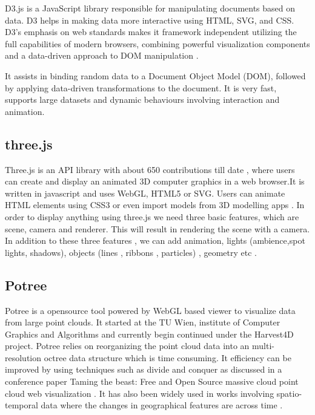     D3.js is a JavaScript library responsible for manipulating
    documents based on data. D3 helps in making data more interactive
    using HTML, SVG, and CSS. D3’s emphasis on web standards makes it
    framework independent utilizing the full capabilities of modern
    browsers, combining powerful visualization components and a
    data-driven approach to DOM manipulation \cite{www-d3}.

    It assists in binding random data to a Document Object Model
    (DOM), followed by applying data-driven transformations to the
    document. It is very fast, supports large datasets and dynamic
    behaviours involving interaction and animation.

    
\subsection{three.js}

    Three.js is an API library with about 650 contributions till date
    , where users can create and display an animated 3D computer
    graphics in a web browser.It is written in javascript and uses
    WebGL, HTML5 or SVG. Users can animate HTML elements using CSS3 or
    even import models from 3D modelling apps
    \cite{www-threejs-wiki}. In order to display anything using
    three.js we need three basic features, which are scene, camera and
    renderer. This will result in rendering the scene with a
    camera. In addition to these three features , we can add
    animation, lights (ambience,spot lights, shadows), objects (lines
    , ribbons , particles) , geometry etc \cite{www-threejs-webpage}.
    
\subsection{Potree}

    Potree \cite{www-potree} is a opensource tool powered by WebGL
    based viewer to visualize data from large point clouds. It started
    at the TU Wien, institute of Computer Graphics and Algorithms and
    currently begin continued under the Harvest4D project. Potree
    relies on reorganizing the point cloud data into an
    multi-resolution octree data structure which is time consuming. It
    efficiency can be improved by using techniques such as divide and
    conquer as discussed in a conference paper Taming the beast: Free
    and Open Source massive cloud point cloud web
    visualization \cite{potree-paper-1}. It has also been widely used
    in works involving spatio-temporal data where the changes in
    geographical features are across time \cite{potree-paper-2}.
    

